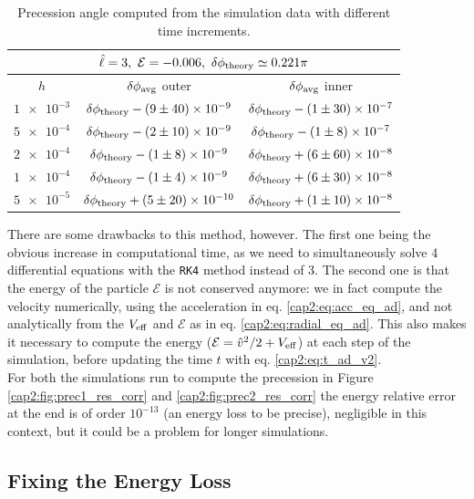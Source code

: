 \begin{table}[h!]
    \centering
    \begin{tabular}{|c|c|c|}
        \hline
        \multicolumn{3}{|c|}{$\hat \ell = 3, ~ \mathcal E = -0.006,
        ~ \delta \phi_{\rm theory} \simeq 0.221 \pi$} \\
        \hline
        $h$ & $\delta \phi_{\rm avg}$ outer & $\delta \phi_{\rm avg}$ inner \\
        \hline
        $\num{1e-3}$ & $\delta \phi_{\rm theory} - (9 \pm 40) \times \num{e-9}$
        & $\delta \phi_{\rm theory} - (1 \pm 30) \times \num{e-7}$ \\
        \hline
        $\num{5e-4}$ & $\delta \phi_{\rm theory} - (2 \pm 10) \times \num{e-9}$
        & $\delta \phi_{\rm theory} - (1 \pm 8) \times \num{e-7}$ \\
        \hline
        $\num{2e-4}$ & $\delta \phi_{\rm theory} - (1 \pm 8) \times \num{e-9}$
        & $\delta \phi_{\rm theory} + (6 \pm 60) \times \num{e-8}$ \\
        \hline
        $\num{1e-4}$ & $\delta \phi_{\rm theory} - (1 \pm 4) \times \num{e-9}$
        & $\delta \phi_{\rm theory} + (6 \pm 30) \times \num{e-8}$ \\
        \hline
        $\num{5e-5}$ & $\delta \phi_{\rm theory} + (5 \pm 20) \times \num{e-10}$
        & $\delta \phi_{\rm theory} + (1 \pm 10) \times \num{e-8}$ \\
        \hline
    \end{tabular}
    \caption{Precession angle computed from the simulation data with different
    time increments.}
    \label{cap2:tab:prec2_corr}
\end{table}

There are some drawbacks to this method, however.
The first one being the obvious increase in computational time, as we need
to simultaneously solve 4 differential equations with the \texttt{RK4} method
instead of 3.
The second one is that the energy of the particle $\mathcal E$ is not conserved
anymore: we in fact compute the velocity numerically, using the acceleration
in eq. \ref{cap2:eq:acc_eq_ad}, and not analytically from the $V_{\rm eff}$ and
$\mathcal E$ as in eq. \ref{cap2:eq:radial_eq_ad}.
This also makes it necessary to compute the energy ($\mathcal E = \hat v^2 / 2 +
V_{\rm eff}$) at each step of the simulation, before updating the \Sh time $t$ with eq. \ref{cap2:eq:t_ad_v2}. \\
For both the simulations run to compute the precession in Figure
\ref{cap2:fig:prec1_res_corr} and \ref{cap2:fig:prec2_res_corr} the energy 
relative error at the end is of order $10^{-13}$ (an energy loss to be precise),
negligible in this context, but it could be a problem for longer
simulations.


\subsection{Fixing the Energy Loss}
